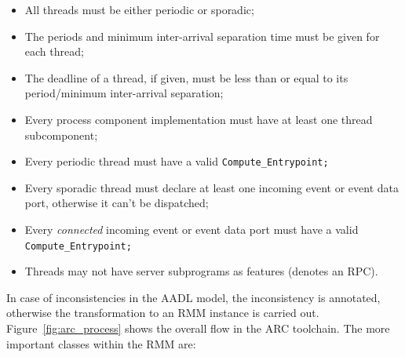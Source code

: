 \begin{itemize}
\item{All threads must be either periodic or sporadic;}
\item{The periods and minimum inter-arrival separation time must be
  given for each thread;}
\item{The deadline of a thread, if given, must be less than or equal
  to its period/minimum inter-arrival separation;}
\item{Every process component implementation must have at least one
  thread subcomponent;}
\item{Every periodic thread must have a valid
  \texttt{Compute\_Entrypoint;}}
\item{Every sporadic thread must declare at least one incoming event
  or event data port, otherwise it can't be dispatched;}
\item{Every \emph{connected} incoming event or event data port must
  have a valid \texttt{Compute\_Entrypoint;}}
\item{Threads may not have server subprograms as features (denotes an
  RPC).}
\end{itemize}

In case of inconsistencies in the AADL model, the inconsistency is
annotated, otherwise the transformation to an RMM instance is carried
out. Figure~\ref{fig:arc_process} shows the overall flow in the ARC
toolchain. The more important classes within the RMM are:

